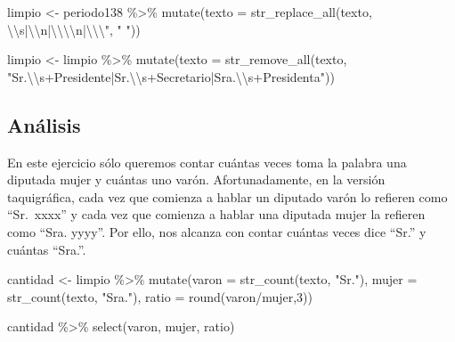 \documentclass[
]{book}
\newenvironment{Shaded}{\begin{snugshade}}{\end{snugshade}}
\newcommand{\AttributeTok}[1]{\textcolor[rgb]{0.77,0.63,0.00}{#1}}
\newcommand{\DecValTok}[1]{\textcolor[rgb]{0.00,0.00,0.81}{#1}}
\newcommand{\FunctionTok}[1]{\textcolor[rgb]{0.00,0.00,0.00}{#1}}
\newcommand{\NormalTok}[1]{#1}
\newcommand{\OtherTok}[1]{\textcolor[rgb]{0.56,0.35,0.01}{#1}}
\newcommand{\SpecialCharTok}[1]{\textcolor[rgb]{0.00,0.00,0.00}{#1}}
\newcommand{\StringTok}[1]{\textcolor[rgb]{0.31,0.60,0.02}{#1}}
\begin{document}
\begin{Shaded}
\begin{Highlighting}[]
\NormalTok{limpio }\OtherTok{\textless{}{-}}\NormalTok{ periodo138 }\SpecialCharTok{\%\textgreater{}\%} 
 \FunctionTok{mutate}\NormalTok{(}\AttributeTok{texto =} \FunctionTok{str\_replace\_all}\NormalTok{(texto, }\StringTok{\textquotesingle{}}\SpecialCharTok{\textbackslash{}\textbackslash{}}\StringTok{s|}\SpecialCharTok{\textbackslash{}\textbackslash{}}\StringTok{n|}\SpecialCharTok{\textbackslash{}\textbackslash{}\textbackslash{}\textbackslash{}}\StringTok{n|}\SpecialCharTok{\textbackslash{}\textbackslash{}\textbackslash{}"}\StringTok{\textquotesingle{}}\NormalTok{, }\StringTok{" "}\NormalTok{))}

\NormalTok{limpio }\OtherTok{\textless{}{-}}\NormalTok{ limpio }\SpecialCharTok{\%\textgreater{}\%} 
  \FunctionTok{mutate}\NormalTok{(}\AttributeTok{texto =} \FunctionTok{str\_remove\_all}\NormalTok{(texto, }\StringTok{"Sr.}\SpecialCharTok{\textbackslash{}\textbackslash{}}\StringTok{s+Presidente|Sr.}\SpecialCharTok{\textbackslash{}\textbackslash{}}\StringTok{s+Secretario|Sra.}\SpecialCharTok{\textbackslash{}\textbackslash{}}\StringTok{s+Presidenta"}\NormalTok{))}
\end{Highlighting}
\end{Shaded}

\hypertarget{anuxe1lisis}{%
\subsection{Análisis}\label{anuxe1lisis}}

En este ejercicio sólo queremos contar cuántas veces toma la palabra una diputada mujer y cuántas uno varón. Afortunadamente, en la versión taquigráfica, cada vez que comienza a hablar un diputado varón lo refieren como ``Sr.~xxxx'' y cada vez que comienza a hablar una diputada mujer la refieren como ``Sra. yyyy''. Por ello, nos alcanza con contar cuántas veces dice ``Sr.'' y cuántas ``Sra.''.

\begin{Shaded}
\begin{Highlighting}[]
\NormalTok{cantidad }\OtherTok{\textless{}{-}}\NormalTok{ limpio }\SpecialCharTok{\%\textgreater{}\%} 
  \FunctionTok{mutate}\NormalTok{(}\AttributeTok{varon =} \FunctionTok{str\_count}\NormalTok{(texto, }\StringTok{"Sr."}\NormalTok{),}
         \AttributeTok{mujer =} \FunctionTok{str\_count}\NormalTok{(texto, }\StringTok{"Sra."}\NormalTok{),}
         \AttributeTok{ratio =} \FunctionTok{round}\NormalTok{(varon}\SpecialCharTok{/}\NormalTok{mujer,}\DecValTok{3}\NormalTok{)) }

\NormalTok{cantidad }\SpecialCharTok{\%\textgreater{}\%} \FunctionTok{select}\NormalTok{(varon, mujer, ratio)}
\end{Highlighting}
\end{Shaded}
\end{document}
